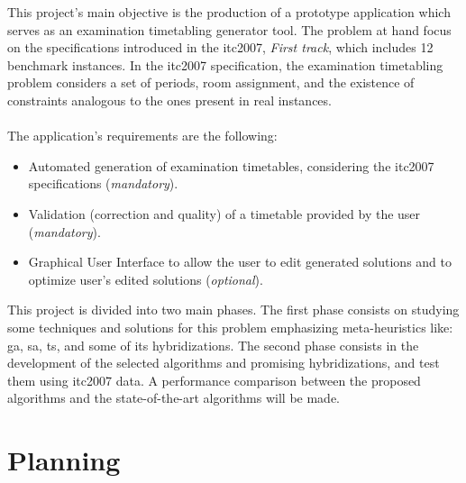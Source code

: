This project's main objective is the production of a prototype application which serves as an examination timetabling generator tool. The problem at hand focus on the specifications introduced in the \gls{itc2007}, \textit{First track}, which includes 12 benchmark instances. In the \gls{itc2007} specification, the examination timetabling problem considers a set of periods, room assignment, and the existence of constraints analogous to the ones present in real instances.\\
\\
The application's requirements are the following:
\begin{itemize}
	\item Automated generation of examination timetables, considering the \gls{itc2007} specifications (\textit{mandatory}).
	\item Validation (correction and quality) of a timetable provided by the user (\textit{mandatory}).
	\item Graphical User Interface to allow the user to edit generated solutions and to optimize user's edited solutions (\textit{optional}).
\end{itemize}
This project is divided into two main phases. The first phase consists on studying some techniques and solutions for this problem emphasizing meta-heuristics like: \gls{ga}, \gls{sa}, \gls{ts}, and some of its hybridizations. The second phase consists in the development of the selected algorithms and promising hybridizations, and test them using \gls{itc2007} data. A performance comparison between the proposed algorithms and the state-of-the-art algorithms will be made.


\section{Planning}

